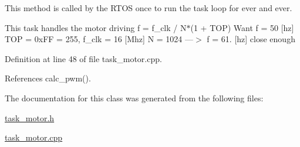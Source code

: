 This method is called by the R\+T\+OS once to run the task loop for ever and ever.

This task handles the motor driving f = f\+\_\+clk / N$\ast$(1 + T\+OP) Want f = 50 \mbox{[}hz\mbox{]} T\+OP = 0x\+FF = 255, f\+\_\+clk = 16 \mbox{[}Mhz\mbox{]} N = 1024 ---$>$ f = 61. \mbox{[}hz\mbox{]} close enough

Definition at line 48 of file task\+\_\+motor.\+cpp.



References calc\+\_\+pwm().



The documentation for this class was generated from the following files\+:\begin{DoxyCompactItemize}
\item 
\mbox{\hyperlink{task__motor_8h}{task\+\_\+motor.\+h}}\item 
\mbox{\hyperlink{task__motor_8cpp}{task\+\_\+motor.\+cpp}}\end{DoxyCompactItemize}
